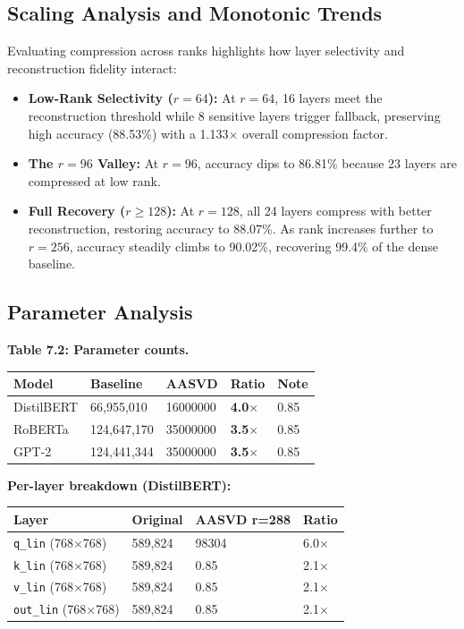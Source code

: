 \subsection{Scaling Analysis and Monotonic Trends}

Evaluating compression across ranks highlights how layer selectivity and reconstruction fidelity interact:
\begin{itemize}
\item \textbf{Low-Rank Selectivity ($r=64$):} At $r=64$, 16 layers meet the reconstruction threshold while 8 sensitive layers trigger fallback, preserving high accuracy (88.53\%) with a 1.133$\times$ overall compression factor.
\item \textbf{The $r=96$ Valley:} At $r=96$, accuracy dips to 86.81\% because 23 layers are compressed at low rank.
\item \textbf{Full Recovery ($r \ge 128$):} At $r=128$, all 24 layers compress with better reconstruction, restoring accuracy to 88.07\%. As rank increases further to $r=256$, accuracy steadily climbs to 90.02\%, recovering 99.4\% of the dense baseline.
\end{itemize}

\subsection{Parameter Analysis}

\textbf{Table 7.2: Parameter counts.}

\begin{table}[H]
\centering
\small
\begin{tabular}{lllll}
\toprule
\textbf{Model} & \textbf{Baseline} & \textbf{AASVD} & \textbf{Ratio} & \textbf{Note} \\
\midrule
DistilBERT & 66,955,010 & 16000000 & \textbf{4.0$\times$} & 0.85 \\
RoBERTa & 124,647,170 & 35000000 & \textbf{3.5$\times$} & 0.85 \\
GPT-2 & 124,441,344 & 35000000 & \textbf{3.5$\times$} & 0.85 \\
\bottomrule
\end{tabular}
\end{table}

\textbf{Per-layer breakdown (DistilBERT):}

\begin{table}[H]
\centering
\small
\begin{tabular}{llll}
\toprule
\textbf{Layer} & \textbf{Original} & \textbf{AASVD r=288} & \textbf{Ratio} \\
\midrule
\texttt{q\_lin} (768$\times$768) & 589,824 & 98304 & 6.0$\times$ \\
\texttt{k\_lin} (768$\times$768) & 589,824 & 0.85 & 2.1$\times$ \\
\texttt{v\_lin} (768$\times$768) & 589,824 & 0.85 & 2.1$\times$ \\
\texttt{out\_lin} (768$\times$768) & 589,824 & 0.85 & 2.1$\times$ \\
\bottomrule
\end{tabular}
\end{table}

